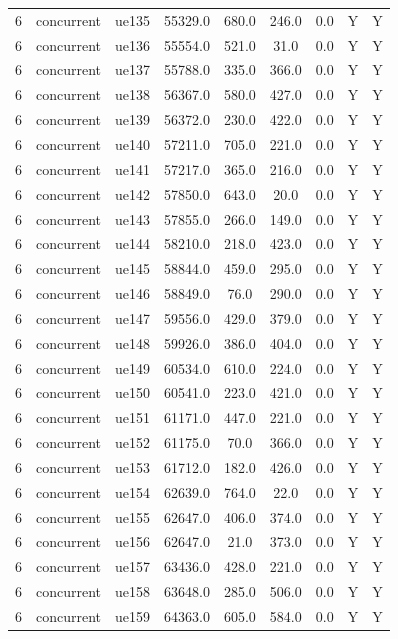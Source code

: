 \begin{table}[ht]
\begin{tabular}{|c|c|c|c|c|c|c|c|c|}
6 & concurrent & ue135 & 55329.0 & 680.0 & 246.0 & 0.0 & Y & Y \\
6 & concurrent & ue136 & 55554.0 & 521.0 & 31.0 & 0.0 & Y & Y \\
6 & concurrent & ue137 & 55788.0 & 335.0 & 366.0 & 0.0 & Y & Y \\
6 & concurrent & ue138 & 56367.0 & 580.0 & 427.0 & 0.0 & Y & Y \\
6 & concurrent & ue139 & 56372.0 & 230.0 & 422.0 & 0.0 & Y & Y \\
6 & concurrent & ue140 & 57211.0 & 705.0 & 221.0 & 0.0 & Y & Y \\
6 & concurrent & ue141 & 57217.0 & 365.0 & 216.0 & 0.0 & Y & Y \\
6 & concurrent & ue142 & 57850.0 & 643.0 & 20.0 & 0.0 & Y & Y \\
6 & concurrent & ue143 & 57855.0 & 266.0 & 149.0 & 0.0 & Y & Y \\
6 & concurrent & ue144 & 58210.0 & 218.0 & 423.0 & 0.0 & Y & Y \\
6 & concurrent & ue145 & 58844.0 & 459.0 & 295.0 & 0.0 & Y & Y \\
6 & concurrent & ue146 & 58849.0 & 76.0 & 290.0 & 0.0 & Y & Y \\
6 & concurrent & ue147 & 59556.0 & 429.0 & 379.0 & 0.0 & Y & Y \\
6 & concurrent & ue148 & 59926.0 & 386.0 & 404.0 & 0.0 & Y & Y \\
6 & concurrent & ue149 & 60534.0 & 610.0 & 224.0 & 0.0 & Y & Y \\
6 & concurrent & ue150 & 60541.0 & 223.0 & 421.0 & 0.0 & Y & Y \\
6 & concurrent & ue151 & 61171.0 & 447.0 & 221.0 & 0.0 & Y & Y \\
6 & concurrent & ue152 & 61175.0 & 70.0 & 366.0 & 0.0 & Y & Y \\
6 & concurrent & ue153 & 61712.0 & 182.0 & 426.0 & 0.0 & Y & Y \\
6 & concurrent & ue154 & 62639.0 & 764.0 & 22.0 & 0.0 & Y & Y \\
6 & concurrent & ue155 & 62647.0 & 406.0 & 374.0 & 0.0 & Y & Y \\
6 & concurrent & ue156 & 62647.0 & 21.0 & 373.0 & 0.0 & Y & Y \\
6 & concurrent & ue157 & 63436.0 & 428.0 & 221.0 & 0.0 & Y & Y \\
6 & concurrent & ue158 & 63648.0 & 285.0 & 506.0 & 0.0 & Y & Y \\
6 & concurrent & ue159 & 64363.0 & 605.0 & 584.0 & 0.0 & Y & Y \\

\end{tabular}
\end{table}
